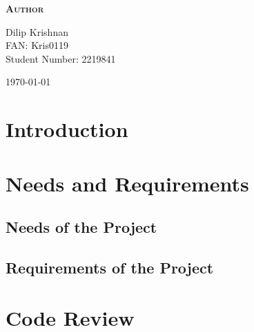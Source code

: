 \documentclass[12pt,oneside,a4paper,english]{article}
\begin{document}
\begin{titlepage}
\begin{center}
    \vspace{1.5cm}
    
    \textsc{\textbf{Author}}\\
    \vspace{.5cm}
    \centering

    Dilip Krishnan\\
    FAN: Kris0119\\
    Student Number: 2219841\\
    
    \vspace{4cm}
    
    \centering \today %
    \end{center}
    \end{titlepage}


\newpage
\doublespacing
\tableofcontents
\renewcommand{\baselinestretch}{1}\normalsize
\singlespacing
\thispagestyle{fancy} %

\newpage


\section{Introduction}
\lipsum[2-5]

\newpage
\section{Needs and Requirements}
\lipsum[4]

\subsection{Needs of the Project}
\lipsum[5]

\subsection{Requirements of the Project}
\lipsum[6-7]

\newpage
\section{Code Review}
\lipsum[8]
\end{document}

